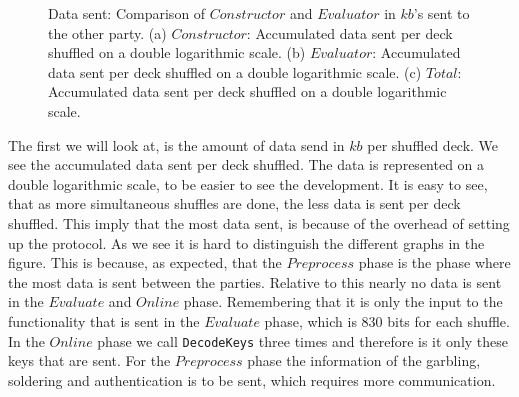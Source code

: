 \documentclass[twoside,11pt,openright]{report}
\begin{document}
\begin{figure}
    \begin{subfigure}{\textwidth}
        \centering
        \caption{}
        \label{fig:total_kb_plot}
    \end{subfigure}

    \caption{Data sent: Comparison of $Constructor$ and $Evaluator$ in $kb$'s sent to the other party. (a) $Constructor$: Accumulated data sent per deck shuffled on a double logarithmic scale. (b) $Evaluator$: Accumulated data sent per deck shuffled on a double logarithmic scale. (c) $Total$: Accumulated data sent per deck shuffled on a double logarithmic scale.}
    \label{fig:mesurement_kb}
\end{figure}

The first we will look at, is the amount of data send in $kb$ per shuffled deck. We see the accumulated data sent per deck shuffled. The data is represented on a double logarithmic scale, to be easier to see the development. It is easy to see, that as more simultaneous shuffles are done, the less data is sent per deck shuffled. This imply that the most data sent, is because of the overhead of setting up the protocol. As we see it is hard to distinguish the different graphs in the figure. This is because, as expected, that the $Preprocess$ phase is the phase where the most data is sent between the parties. Relative to this nearly no data is sent in the $Evaluate$ and $Online$ phase. Remembering that it is only the input to the functionality that is sent in the $Evaluate$ phase, which is $830$ bits for each shuffle. In the $Online$ phase we call \verb|DecodeKeys| three times and therefore is it only these keys that are sent. For the $Preprocess$ phase the information of the garbling, soldering and authentication is to be sent, which requires more communication.
\end{document}
